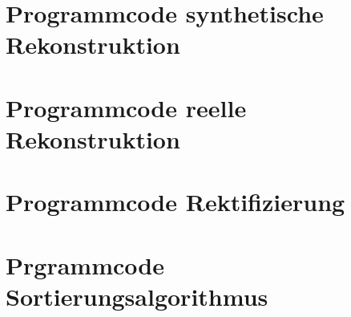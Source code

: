 
\section*{Programmcode synthetische Rekonstruktion}







\section*{Programmcode reelle Rekonstruktion}







\section*{Programmcode Rektifizierung}



\section*{Prgrammcode Sortierungsalgorithmus}



